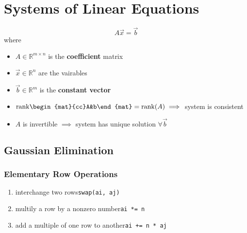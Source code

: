 \section{Systems of Linear Equations}
	\begin{definition}
		$$A\vec x=\vec b$$
		where 
		\begin{itemize}
			\item $A\in\mathbb{R}^{m\times n}$ is the \textbf{coefficient} matrix
			\item $\vec x\in\mathbb{R}^n$ are the vairables
			\item $\vec b\in\mathbb{R}^m$ is the \textbf{constant vector}
			\item $\mathrm{rank}\begin{mat}{cc}A&b\end{mat}=\mathrm{rank}(A)\implies$ system is consistent
			\item $A$ is invertible $\implies$ system has unique solution $\forall\vec b$
		\end{itemize}
	\end{definition}
    \subsection{Gaussian Elimination}
	    \subsubsection{Elementary Row Operations}
		    \begin{definition}
				\begin{enumerate}
					\item interchange two rows\quad\texttt{swap(ai, aj)}
					\item multily a row by a nonzero number\quad\texttt{ai *= n}
					\item add a multiple of one row to another\quad\texttt{ai += n * aj}
				\end{enumerate}
		    \end{definition}
